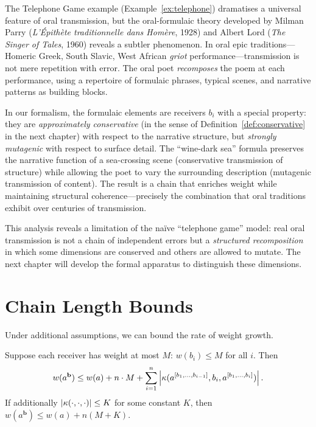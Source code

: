 \begin{interpretation}
\label{interp:ch8:lord_oral_tradition}
The Telephone Game example (Example~\ref{ex:telephone}) dramatises a
universal feature of oral transmission, but the oral-formulaic theory
developed by Milman Parry (\emph{L'\'Epith\`ete traditionnelle dans
Hom\`ere}, 1928) and Albert Lord (\emph{The Singer of Tales}, 1960) reveals
a subtler phenomenon.  In oral epic traditions---Homeric Greek, South Slavic,
West African \emph{griot} performance---transmission is not mere repetition
with error.  The oral poet \emph{recomposes} the poem at each performance,
using a repertoire of formulaic phrases, typical scenes, and narrative
patterns as building blocks.

In our formalism, the formulaic elements are receivers $b_i$ with a special
property: they are \emph{approximately conservative} (in the sense of
Definition~\ref{def:conservative} in the next chapter) with respect to the
narrative structure, but \emph{strongly mutagenic} with respect to surface
detail.  The ``wine-dark sea'' formula preserves the narrative function of a
sea-crossing scene (conservative transmission of structure) while allowing
the poet to vary the surrounding description (mutagenic transmission of
content).  The result is a chain that enriches weight while maintaining
structural coherence---precisely the combination that oral traditions exhibit
over centuries of transmission.

This analysis reveals a limitation of the na\"{i}ve ``telephone game'' model:
real oral transmission is not a chain of independent errors but a
\emph{structured recomposition} in which some dimensions are conserved and
others are allowed to mutate.  The next chapter will develop the formal
apparatus to distinguish these dimensions.
\end{interpretation}



\section{Chain Length Bounds}

Under additional assumptions, we can bound the rate of weight growth.

\begin{proposition}
\label{prop:linear-growth}
Suppose each receiver has weight at most $M$: $w(b_i) \leq M$ for all $i$.
Then
\[
  w(a^{\mathbf{b}}) \leq w(a) + n \cdot M
    + \sum_{i=1}^{n}
      \left|
        \kappa(a^{[b_1,\ldots,b_{i-1}]}, b_i, a^{[b_1,\ldots,b_i]})
      \right|.
\]
If additionally $|\kappa(\cdot, \cdot, \cdot)| \leq K$ for some constant
$K$, then $w(a^{\mathbf{b}}) \leq w(a) + n(M + K)$.
\end{proposition}


